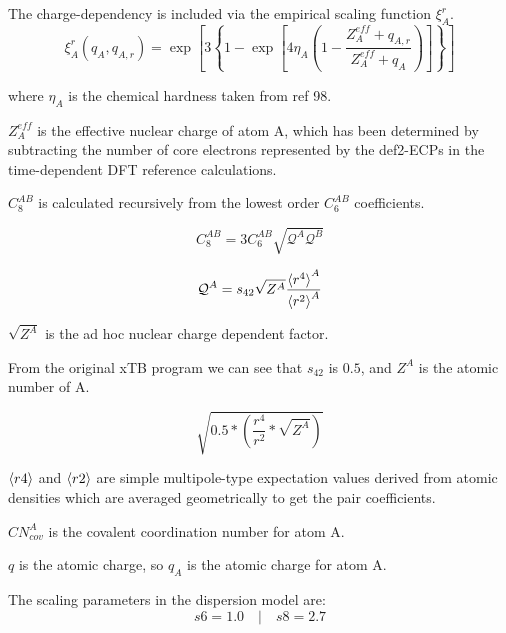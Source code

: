 \noindent
The charge-dependency is included via the empirical scaling function \(\xi_A^r\).
\begin{equation}
  \xi_A^r(q_A, q_{A,r}) = \exp\left[3\left\{1-\exp\left[4\eta_A\left(1-\frac{Z_A^{eff} + q_{A,r}}{Z_A^{eff} + q_A}\right)\right]\right\}\right]
\end{equation}

\noindent
where \(\eta_A\) is the chemical hardness taken from ref 98.

\noindent
\(Z_A^{eff}\) is the effective nuclear charge of atom A, which has been determined by subtracting the number of core electrons represented by the def2-ECPs in the time-dependent DFT reference calculations.



\vspace{10pt}
\noindent
\(C_8^{AB}\) is calculated recursively from the lowest order \(C_6^{AB}\) coefficients.

\begin{equation}
  C_8^{AB} = 3C_6^{AB} \sqrt{\mathcal{Q}^A\mathcal{Q}^B}
\end{equation}

\begin{equation}
  \mathcal{Q}^A = s_{42} \sqrt{Z^A} \frac{\braket{r^4}^A}{\braket{r^2}^A}
\end{equation}


\vspace{10pt}
\noindent
\(\sqrt{Z^A}\) is the ad hoc nuclear charge dependent factor.

From the original xTB program we can see that \(s_{42}\) is \(0.5\), and \(Z^A\) is the atomic number of A.

\begin{equation}
  \sqrt{0.5 * (\frac{r^4}{r^2} * \sqrt{Z^A})}
\end{equation}

\(\braket{r4}\) and \(\braket{r2}\) are simple multipole-type expectation values derived from atomic densities which are averaged geometrically to get the pair coefficients.

\vspace{20pt}
\noindent
\(CN^A_{cov}\) is the covalent coordination number for atom A.

\vspace{10pt}
\noindent
\(q\) is the atomic charge, so \(q_A\) is the atomic charge for atom A.

\vspace{10pt}
\noindent
The scaling parameters in the dispersion model are:
\[
  s6 = 1.0 \quad|\quad s8 = 2.7
\]

